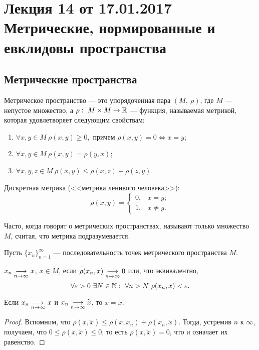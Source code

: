\section{Лекция 14 от 17.01.2017 \\ Метрические, нормированные и евклидовы пространства}

\subsection{Метрические пространства}

\begin{Def}
Метрическое пространство --- это упорядоченная пара $(M,\ \rho)$, где $M$ --- непустое множество, а $\rho:\ M\times M \to \mathbb{R}$ --- функция, называемая метрикой, которая удовлетворяет следующим свойствам:
\begin{enumerate}
\item $\forall x, y \in M\ \rho(x, y) \geq 0,$ причем $\rho(x, y) = 0 \Leftrightarrow x = y$;
\item $\forall x, y \in M\ \rho(x, y) = \rho(y, x)$;
\item $\forall x, y, z \in M\ \rho(x, y) \leq \rho(x, z) + \rho(z, y)$.
\end{enumerate}
\end{Def}

\begin{Examples}
Дискретная метрика (<<метрика ленивого человека>>):
$$
\rho(x, y) = \begin{cases}
0, & x = y;\\
1, & x \neq y.
\end{cases}
$$
\end{Examples}

Часто, когда говорят о метрических пространствах, называют только множество $M$, считая, что метрика подразумевается.

Пусть $\{x_n\}_{n=1}^{\infty}$ --- последовательность точек метрического пространства $M$.
\begin{Def}
$x_n \underset{n\to \infty}{\longrightarrow} x $, $x\in M$, если $\rho(x_n, x) \underset{n\to \infty}{\longrightarrow} 0$ или, что эквивалентно,
$$
\forall \varepsilon > 0\ \exists N \in \mathbb{N}:\ \forall n > N\ \rho(x_n, x) < \varepsilon.
$$
\end{Def}

\begin{Statement}
Если $x_n \underset{n\to \infty}{\longrightarrow} x$ и $x_n \underset{n\to \infty}{\longrightarrow} \widetilde{x}$, то $x = \widetilde{x}$.
\end{Statement}
\begin{proof}
Вспомним, что $\rho(x, \widetilde{x}) \leq \rho(x, x_n) + \rho(x_n, \widetilde{x})$. Тогда, устремив $n$ к $\infty$, получаем, что $0 \leq \rho(x, \widetilde{x}) \leq 0$, то есть $\rho(x, \widetilde{x}) = 0$, что и означает их равенство. 
\end{proof}


